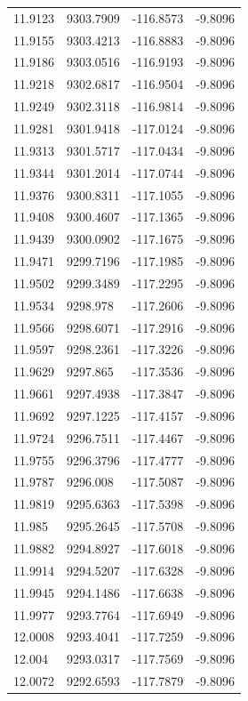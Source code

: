 \begin{table}[H]
\begin{tabular}{llll}
11.9123 & 9303.7909 & -116.8573 & -9.8096 \\
11.9155 & 9303.4213 & -116.8883 & -9.8096 \\
11.9186 & 9303.0516 & -116.9193 & -9.8096 \\
11.9218 & 9302.6817 & -116.9504 & -9.8096 \\
11.9249 & 9302.3118 & -116.9814 & -9.8096 \\
11.9281 & 9301.9418 & -117.0124 & -9.8096 \\
11.9313 & 9301.5717 & -117.0434 & -9.8096 \\
11.9344 & 9301.2014 & -117.0744 & -9.8096 \\
11.9376 & 9300.8311 & -117.1055 & -9.8096 \\
11.9408 & 9300.4607 & -117.1365 & -9.8096 \\
11.9439 & 9300.0902 & -117.1675 & -9.8096 \\
11.9471 & 9299.7196 & -117.1985 & -9.8096 \\
11.9502 & 9299.3489 & -117.2295 & -9.8096 \\
11.9534 & 9298.978 & -117.2606 & -9.8096 \\
11.9566 & 9298.6071 & -117.2916 & -9.8096 \\
11.9597 & 9298.2361 & -117.3226 & -9.8096 \\
11.9629 & 9297.865 & -117.3536 & -9.8096 \\
11.9661 & 9297.4938 & -117.3847 & -9.8096 \\
11.9692 & 9297.1225 & -117.4157 & -9.8096 \\
11.9724 & 9296.7511 & -117.4467 & -9.8096 \\
11.9755 & 9296.3796 & -117.4777 & -9.8096 \\
11.9787 & 9296.008 & -117.5087 & -9.8096 \\
11.9819 & 9295.6363 & -117.5398 & -9.8096 \\
11.985 & 9295.2645 & -117.5708 & -9.8096 \\
11.9882 & 9294.8927 & -117.6018 & -9.8096 \\
11.9914 & 9294.5207 & -117.6328 & -9.8096 \\
11.9945 & 9294.1486 & -117.6638 & -9.8096 \\
11.9977 & 9293.7764 & -117.6949 & -9.8096 \\
12.0008 & 9293.4041 & -117.7259 & -9.8096 \\
12.004 & 9293.0317 & -117.7569 & -9.8096 \\
12.0072 & 9292.6593 & -117.7879 & -9.8096 \\

\end{tabular}
\end{table}
